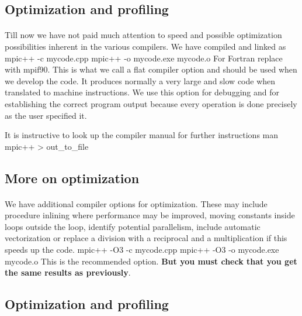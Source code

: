 \documentclass[%
twoside,                 %
final,                   %
10pt]{article}
\begin{document}
{%
\subsection{Optimization and profiling}

\paragraph{}


Till now we have not paid much attention to speed and possible optimization possibilities
inherent in the various compilers. We have compiled and linked as
\bcppcod
mpic++  -c  mycode.cpp
mpic++  -o  mycode.exe  mycode.o
\ecppcod
For Fortran replace with mpif90.
This is what we call a flat compiler option and should be used when we develop the code.
It produces normally a very large and slow code when translated to machine instructions.
We use this option for debugging and for establishing the correct program output because
every operation is done precisely as the user specified it.

It is instructive to look up the compiler manual for further instructions
\bcppcod
man mpic++  >  out_to_file
\ecppcod


\subsection{More on optimization}

\paragraph{}
We have additional compiler options for optimization. These may include procedure inlining where 
performance may be improved, moving constants inside loops outside the loop, 
identify potential parallelism, include automatic vectorization or replace a division with a reciprocal
and a multiplication if this speeds up the code.
\bcppcod
mpic++  -O3 -c  mycode.cpp
mpic++  -O3 -o  mycode.exe  mycode.o
\ecppcod
This is the recommended option. \textbf{But you must check that you get the same results as previously}.


\subsection{Optimization and profiling}

}
\end{document}
